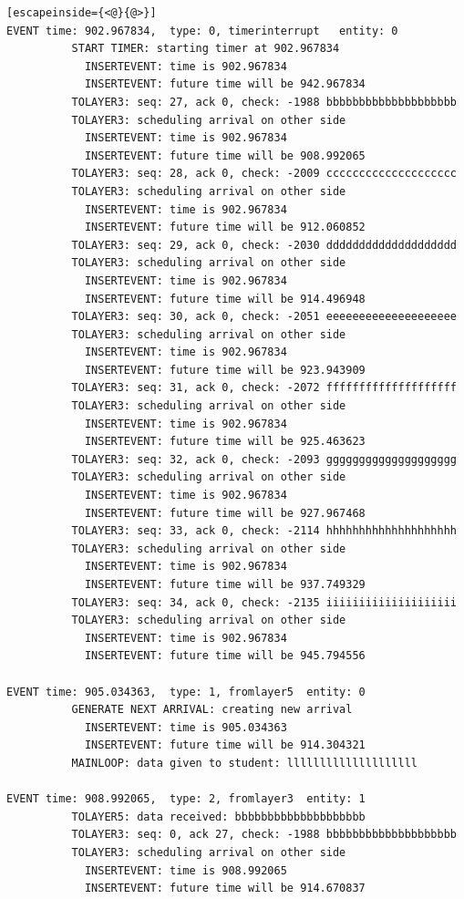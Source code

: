 \documentclass[paper=a4, fontsize=11pt]{scrartcl}
\numberwithin{equation}{section}		%
\numberwithin{figure}{section}			%
\numberwithin{table}{section}				%
\begin{document}
\begin{lstlisting}[escapeinside={<@}{@>}]
EVENT time: 902.967834,  type: 0, timerinterrupt   entity: 0
          START TIMER: starting timer at 902.967834
            INSERTEVENT: time is 902.967834
            INSERTEVENT: future time will be 942.967834
          TOLAYER3: seq: 27, ack 0, check: -1988 bbbbbbbbbbbbbbbbbbbb
          TOLAYER3: scheduling arrival on other side
            INSERTEVENT: time is 902.967834
            INSERTEVENT: future time will be 908.992065
          TOLAYER3: seq: 28, ack 0, check: -2009 cccccccccccccccccccc
          TOLAYER3: scheduling arrival on other side
            INSERTEVENT: time is 902.967834
            INSERTEVENT: future time will be 912.060852
          TOLAYER3: seq: 29, ack 0, check: -2030 dddddddddddddddddddd
          TOLAYER3: scheduling arrival on other side
            INSERTEVENT: time is 902.967834
            INSERTEVENT: future time will be 914.496948
          TOLAYER3: seq: 30, ack 0, check: -2051 eeeeeeeeeeeeeeeeeeee
          TOLAYER3: scheduling arrival on other side
            INSERTEVENT: time is 902.967834
            INSERTEVENT: future time will be 923.943909
          TOLAYER3: seq: 31, ack 0, check: -2072 ffffffffffffffffffff
          TOLAYER3: scheduling arrival on other side
            INSERTEVENT: time is 902.967834
            INSERTEVENT: future time will be 925.463623
          TOLAYER3: seq: 32, ack 0, check: -2093 gggggggggggggggggggg
          TOLAYER3: scheduling arrival on other side
            INSERTEVENT: time is 902.967834
            INSERTEVENT: future time will be 927.967468
          TOLAYER3: seq: 33, ack 0, check: -2114 hhhhhhhhhhhhhhhhhhhh
          TOLAYER3: scheduling arrival on other side
            INSERTEVENT: time is 902.967834
            INSERTEVENT: future time will be 937.749329
          TOLAYER3: seq: 34, ack 0, check: -2135 iiiiiiiiiiiiiiiiiiii
          TOLAYER3: scheduling arrival on other side
            INSERTEVENT: time is 902.967834
            INSERTEVENT: future time will be 945.794556

EVENT time: 905.034363,  type: 1, fromlayer5  entity: 0
          GENERATE NEXT ARRIVAL: creating new arrival
            INSERTEVENT: time is 905.034363
            INSERTEVENT: future time will be 914.304321
          MAINLOOP: data given to student: llllllllllllllllllll

EVENT time: 908.992065,  type: 2, fromlayer3  entity: 1
          TOLAYER5: data received: bbbbbbbbbbbbbbbbbbbb
          TOLAYER3: seq: 0, ack 27, check: -1988 bbbbbbbbbbbbbbbbbbbb
          TOLAYER3: scheduling arrival on other side
            INSERTEVENT: time is 908.992065
            INSERTEVENT: future time will be 914.670837


\end{lstlisting}
\end{document}
